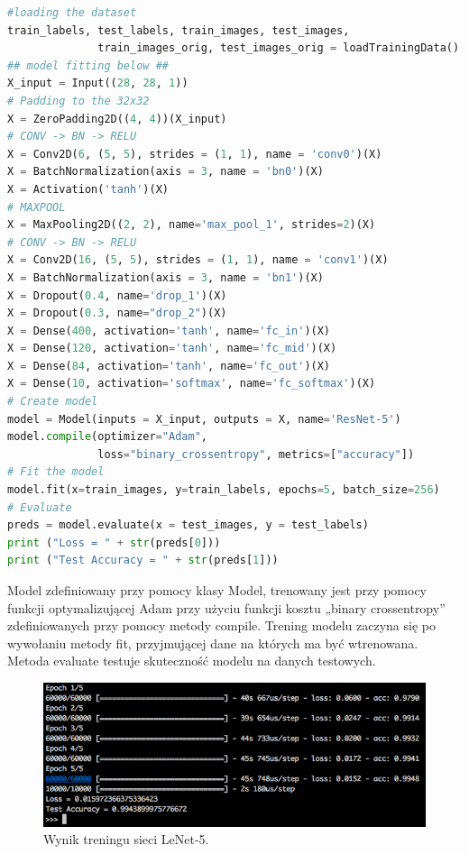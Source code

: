 \label{lst:lenet5keras}
\begin{lstlisting}[language=Python, caption={Model sieci LeNet-5 w Keras.}, captionpos=b]
#loading the dataset
train_labels, test_labels, train_images, test_images, 
              train_images_orig, test_images_orig = loadTrainingData();
## model fitting below ##
X_input = Input((28, 28, 1))
# Padding to the 32x32
X = ZeroPadding2D((4, 4))(X_input)
# CONV -> BN -> RELU
X = Conv2D(6, (5, 5), strides = (1, 1), name = 'conv0')(X)
X = BatchNormalization(axis = 3, name = 'bn0')(X)
X = Activation('tanh')(X)
# MAXPOOL
X = MaxPooling2D((2, 2), name='max_pool_1', strides=2)(X)
# CONV -> BN -> RELU
X = Conv2D(16, (5, 5), strides = (1, 1), name = 'conv1')(X)
X = BatchNormalization(axis = 3, name = 'bn1')(X)
X = Dropout(0.4, name='drop_1')(X)
X = Dropout(0.3, name="drop_2")(X)
X = Dense(400, activation='tanh', name='fc_in')(X)
X = Dense(120, activation='tanh', name='fc_mid')(X)
X = Dense(84, activation='tanh', name='fc_out')(X)
X = Dense(10, activation='softmax', name='fc_softmax')(X)
# Create model
model = Model(inputs = X_input, outputs = X, name='ResNet-5')
model.compile(optimizer="Adam", 
              loss="binary_crossentropy", metrics=["accuracy"])
# Fit the model
model.fit(x=train_images, y=train_labels, epochs=5, batch_size=256)
# Evaluate
preds = model.evaluate(x = test_images, y = test_labels)
print ("Loss = " + str(preds[0]))
print ("Test Accuracy = " + str(preds[1]))
\end{lstlisting}

Model zdefiniowany przy pomocy klasy Model, trenowany jest przy pomocy funkcji optymalizującej Adam przy użyciu funkcji 
kosztu „binary crossentropy'' zdefiniowanych przy pomocy metody compile. Trening modelu zaczyna się po wywołaniu metody fit, przyjmującej dane na których ma być wtrenowana.
Metoda evaluate testuje skuteczność modelu na danych testowych.

\begin{figure}[ht]
\centerline{\includegraphics[scale=0.5]{resources/training_lenet5.png}}
\caption{Wynik treningu sieci LeNet-5.}
\label{fig:lenet5-training}
\end{figure}

